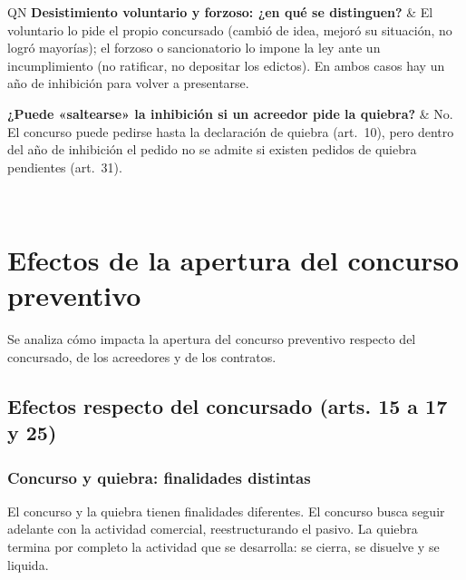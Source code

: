 \documentclass[12pt,oneside]{book}
\begin{document}
\begin{longtable}{QN}
\textbf{Desistimiento voluntario y forzoso: ¿en qué se distinguen?} &
El voluntario lo pide el propio concursado (cambió de idea, mejoró su situación, no logró mayorías); el forzoso o sancionatorio lo impone la ley ante un incumplimiento (no ratificar, no depositar los edictos). En ambos casos hay un año de inhibición para volver a presentarse. \\
\addlinespace[0.6em]

\textbf{¿Puede «saltearse» la inhibición si un acreedor pide la quiebra?} &
No. El concurso puede pedirse hasta la declaración de quiebra (art.~10), pero dentro del año de inhibición el pedido no se admite si existen pedidos de quiebra pendientes (art.~31). \\
\midrule

 \\
\bottomrule
\end{longtable}

\chapter[Efectos de la apertura]{Efectos de la apertura del concurso preventivo}

Se analiza cómo impacta la apertura del concurso preventivo respecto del concursado, de los acreedores y de los contratos.

\section{Efectos respecto del concursado (arts. 15 a 17 y 25)}

\subsection{Concurso y quiebra: finalidades distintas}

El concurso y la quiebra tienen finalidades diferentes. El concurso busca seguir adelante con la actividad comercial, reestructurando el pasivo. La quiebra termina por completo la actividad que se desarrolla: se cierra, se disuelve y se liquida.
\end{document}

